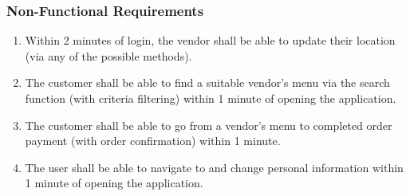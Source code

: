 \subsubsection{Non-Functional Requirements}
\begin{enumerate}
  \item Within 2 minutes of login, the vendor shall be able to update their location (via any of the possible methods).
  \item The customer shall be able to find a suitable vendor's menu via the search function (with criteria filtering) within 1 minute of opening the application.
  \item The customer shall be able to go from a vendor's menu to completed order payment (with order confirmation) within 1 minute.
  \item The user shall be able to navigate to and change personal information within 1 minute of opening the application.
\end{enumerate}

